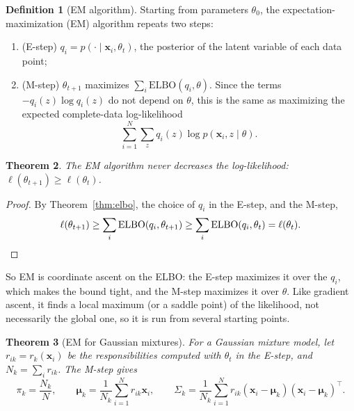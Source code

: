 \documentclass[11pt]{article}
\theoremstyle{definition}
\newtheorem{definition}{Definition}[section]
\theoremstyle{plain}
\newtheorem{theorem}[definition]{Theorem}
\theoremstyle{remark}
\begin{document}
\begin{definition}[EM algorithm]\label{def:em}
    Starting from parameters $\theta_0$, the expectation-maximization (EM) algorithm repeats two steps:
    \begin{enumerate}
        \item (E-step) $q_i = p(\cdot \mid \mathbf{x}_i, \theta_t)$, the posterior of the latent variable of each data point;
        \item (M-step) $\theta_{t+1}$ maximizes $\sum_i \mathrm{ELBO}(q_i, \theta)$. Since the terms $-q_i(z)\log q_i(z)$ do not depend on $\theta$, this is the same as maximizing the expected complete-data log-likelihood
        \[\sum_{i=1}^N \sum_z q_i(z)\log p(\mathbf{x}_i, z \mid \theta).\]
    \end{enumerate}
\end{definition}

\begin{theorem}\label{thm:em-monotone}
    The EM algorithm never decreases the log-likelihood: $\ell(\theta_{t+1}) \geq \ell(\theta_t)$.
\end{theorem}

\begin{proof}
    By Theorem~\ref{thm:elbo}, the choice of $q_i$ in the E-step, and the M-step,
    \[\ell(\theta_{t+1}) \geq \sum_i \mathrm{ELBO}(q_i, \theta_{t+1}) \geq \sum_i \mathrm{ELBO}(q_i, \theta_t) = \ell(\theta_t). \qedhere\]
\end{proof}

So EM is coordinate ascent on the ELBO: the E-step maximizes it over the $q_i$, which makes the bound tight, and the M-step maximizes it over $\theta$. Like gradient ascent, it finds a local maximum (or a saddle point) of the likelihood, not necessarily the global one, so it is run from several starting points.

\begin{theorem}[EM for Gaussian mixtures]\label{thm:em-gmm}
    For a Gaussian mixture model, let $r_{ik} = r_k(\mathbf{x}_i)$ be the responsibilities computed with $\theta_t$ in the E-step, and $N_k = \sum_i r_{ik}$. The M-step gives
    \[\pi_k = \frac{N_k}{N}, \qquad \boldsymbol{\mu}_k = \frac{1}{N_k}\sum_{i=1}^N r_{ik}\mathbf{x}_i, \qquad \Sigma_k = \frac{1}{N_k}\sum_{i=1}^N r_{ik}(\mathbf{x}_i - \boldsymbol{\mu}_k)(\mathbf{x}_i - \boldsymbol{\mu}_k)^\top.\]
\end{theorem}
\end{document}
